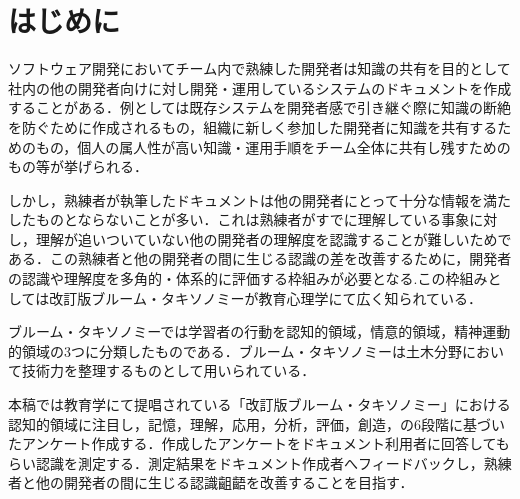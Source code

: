 \section{はじめに}
ソフトウェア開発においてチーム内で熟練した開発者は知識の共有を目的として社内の他の開発者向けに対し開発・運用しているシステムのドキュメントを作成することがある．例としては既存システムを開発者感で引き継ぐ際に知識の断絶を防ぐために作成されるもの，組織に新しく参加した開発者に知識を共有するためのもの，個人の属人性が高い知識・運用手順をチーム全体に共有し残すためのもの等が挙げられる．

しかし，熟練者が執筆したドキュメントは他の開発者にとって十分な情報を満たしたものとならないことが多い．これは熟練者がすでに理解している事象に対し，理解が追いついていない他の開発者の理解度を認識することが難しいためである．この熟練者と他の開発者の間に生じる認識の差を改善するために，開発者の認識や理解度を多角的・体系的に評価する枠組みが必要となる.この枠組みとしては改訂版ブルーム・タキソノミーが教育心理学にて広く知られている\cite{bib:nakao}．

ブルーム・タキソノミーでは学習者の行動を認知的領域，情意的領域，精神運動的領域の3つに分類したものである．ブルーム・タキソノミーは土木分野において技術力を整理するものとして用いられている．\cite{bib:miyahara}

本稿では教育学にて提唱されている「改訂版ブルーム・タキソノミー」における認知的領域に注目し，記憶，理解，応用，分析，評価，創造，の6段階に基づいたアンケート作成する．作成したアンケートをドキュメント利用者に回答してもらい認識を測定する．測定結果をドキュメント作成者へフィードバックし，熟練者と他の開発者の間に生じる認識齟齬を改善することを目指す．

